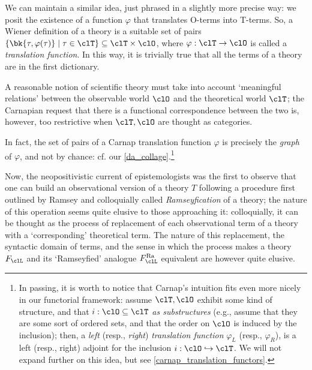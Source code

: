 We can maintain a similar idea, just phrased in a slightly more precise way: we posit the existence of a function $\varphi$ that translates O-terms into T-terms. So, a Wiener definition of a theory is a suitable set of pairs $\{\bk{\tau,\varphi(\tau)} \mid \tau\in\clT\}\subseteq \clT\times\clO$, where $\varphi: \clT \to \clO$ is called a \emph{translation function}. In this way, it is trivially true that all the terms of a theory are in the first dictionary.
\begin{remark*}
  A reasonable notion of scientific theory must take into account `meaningful relations' between the observable world $\clO$ and the theoretical world $\clT$; the Carnapian request that there is a functional correspondence between the two is, however, too restrictive when $\clT,\clO$ are thought as categories.
\end{remark*}
In fact, the set of pairs of a Carnap translation function $\varphi$ is precisely the \emph{graph} of $\varphi$, and not by chance: cf. our \autoref{da_collage}.\footnote{In passing, it is worth to notice that Carnap's intuition fits even more nicely in our functorial framework: assume $\clT, \clO$ exhibit some kind of structure, and that $i : \clO\subseteq\clT$ \emph{as substructures} (e.g., assume that they are some sort of ordered sets, and that the order on $\clO$ is induced by the inclusion); then, a \emph{left} (resp., \emph{right}) \emph{translation function} $\varphi_L$ (resp., $\varphi_R$), is a left (resp., right) adjoint for the inclusion $i : \clO\hookrightarrow \clT$. We will not expand further on this idea, but see \autoref{carnap_translation_functors}.}

Now, the neopositivistic current of epistemologists was the first to observe that one can build an observational version of a theory $T$ following a procedure first outlined by Ramsey \cite{ramsey1931foundations} and colloquially called \emph{Ramseyfication} of a theory; the nature of this operation seems quite elusive to those approaching it: colloquially, it can be thought as the process of replacement of each observational term of a theory with a `corresponding' theoretical term. The nature of this replacement, the syntactic domain of terms, and the sense in which the process makes a theory $F_\clL$ and its `Ramseyfied' analogue $F_\clL^\text{Ra}$ equivalent are however quite elusive.

